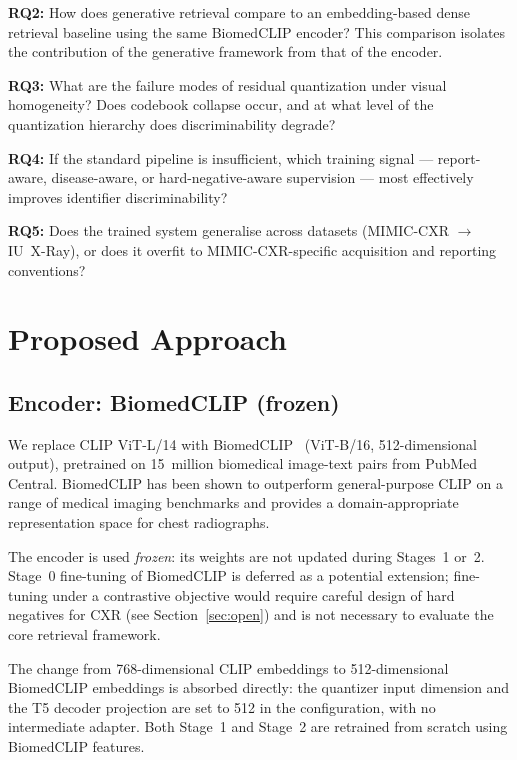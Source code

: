\documentclass[11pt,a4paper]{article}
\begin{document}
\textbf{RQ2:}
How does generative retrieval compare to an embedding-based dense retrieval
baseline using the same BiomedCLIP encoder?
This comparison isolates the contribution of the generative framework from
that of the encoder.

\textbf{RQ3:}
What are the failure modes of residual quantization under visual homogeneity?
Does codebook collapse occur, and at what level of the quantization hierarchy
does discriminability degrade?

\textbf{RQ4:}
If the standard pipeline is insufficient, which training signal ---
report-aware, disease-aware, or hard-negative-aware supervision --- most
effectively improves identifier discriminability?

\textbf{RQ5:}
Does the trained system generalise across datasets
(MIMIC-CXR $\to$ IU~X-Ray), or does it overfit to MIMIC-CXR-specific
acquisition and reporting conventions?

\section{Proposed Approach}

\subsection{Encoder: BiomedCLIP (frozen)}

We replace CLIP ViT-L/14 with BiomedCLIP~\cite{biomedclip2024}
(ViT-B/16, 512-dimensional output), pretrained on 15~million biomedical
image-text pairs from PubMed Central.
BiomedCLIP has been shown to outperform general-purpose CLIP on a range of
medical imaging benchmarks and provides a domain-appropriate representation
space for chest radiographs.

The encoder is used \emph{frozen}: its weights are not updated during
Stages~1 or~2.
Stage~0 fine-tuning of BiomedCLIP is deferred as a potential extension;
fine-tuning under a contrastive objective would require careful design of
hard negatives for CXR (see Section~\ref{sec:open}) and is not necessary to
evaluate the core retrieval framework.

The change from 768-dimensional CLIP embeddings to 512-dimensional BiomedCLIP
embeddings is absorbed directly: the quantizer input dimension and the T5
decoder projection are set to 512 in the configuration, with no intermediate
adapter.
Both Stage~1 and Stage~2 are retrained from scratch using BiomedCLIP features.
\end{document}
